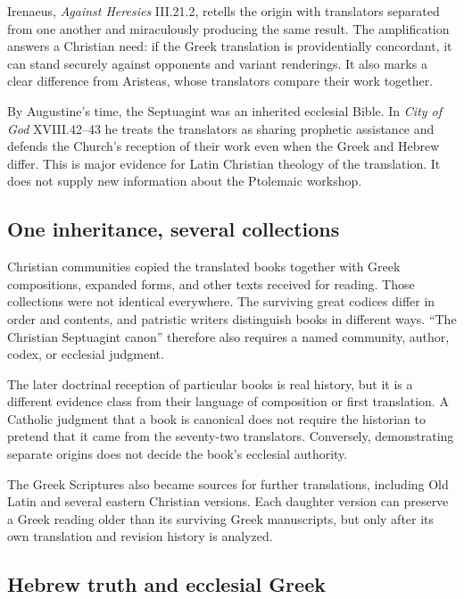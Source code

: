 Irenaeus, \emph{Against Heresies} III.21.2, retells the origin with translators separated from one another and miraculously producing the same result. The amplification answers a Christian need: if the Greek translation is providentially concordant, it can stand securely against opponents and variant renderings. It also marks a clear difference from Aristeas, whose translators compare their work together.

By Augustine's time, the Septuagint was an inherited ecclesial Bible. In \emph{City of God} XVIII.42--43 he treats the translators as sharing prophetic assistance and defends the Church's reception of their work even when the Greek and Hebrew differ. This is major evidence for Latin Christian theology of the translation. It does not supply new information about the Ptolemaic workshop.

\subsection{One inheritance, several collections}

Christian communities copied the translated books together with Greek compositions, expanded forms, and other texts received for reading. Those collections were not identical everywhere. The surviving great codices differ in order and contents, and patristic writers distinguish books in different ways. ``The Christian Septuagint canon'' therefore also requires a named community, author, codex, or ecclesial judgment.

The later doctrinal reception of particular books is real history, but it is a different evidence class from their language of composition or first translation. A Catholic judgment that a book is canonical does not require the historian to pretend that it came from the seventy-two translators. Conversely, demonstrating separate origins does not decide the book's ecclesial authority.

The Greek Scriptures also became sources for further translations, including Old Latin and several eastern Christian versions. Each daughter version can preserve a Greek reading older than its surviving Greek manuscripts, but only after its own translation and revision history is analyzed.

\subsection{Hebrew truth and ecclesial Greek}

